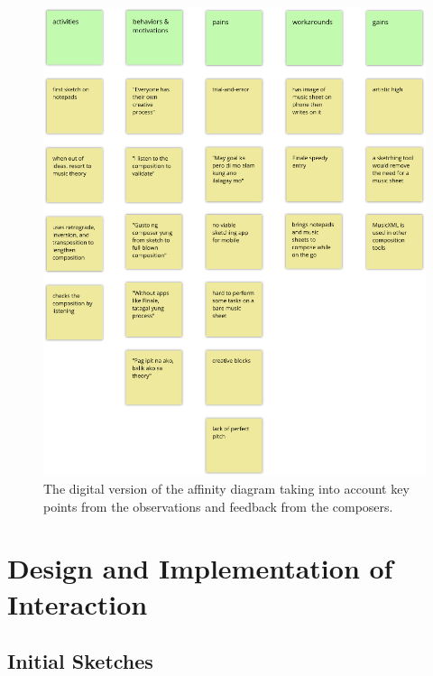 		\begin{figure}[H]
			\centering
			\includegraphics[scale=0.45]{figures/affinity_diagram.png}
		    \caption{The digital version of the affinity diagram taking into account key points from the observations and feedback from the composers. }
		    \label{fig:affinity-diagram}
		\end{figure} 

	\section{Design and Implementation of Interaction}
	\label{sec:design}

		\subsection{Initial Sketches}

